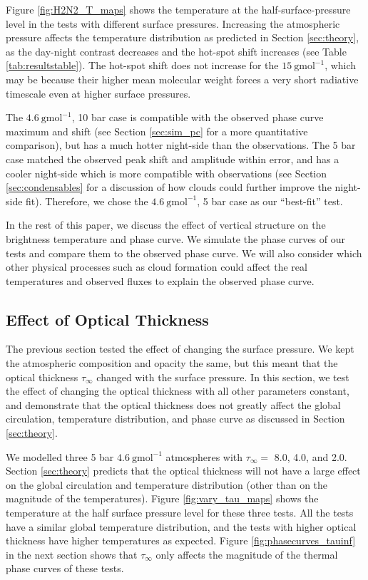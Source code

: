 Figure \ref{fig:H2N2_T_maps} shows the temperature at the half-surface-pressure level in the tests with different surface pressures. Increasing the atmospheric pressure affects the temperature distribution as predicted in Section \ref{sec:theory}, as the day-night contrast decreases and the hot-spot shift increases (see Table \ref{tab:resultstable}). The hot-spot shift does not increase for the $15\ \mathrm{gmol}^{-1}$, which may be because their higher mean molecular weight forces a very short radiative timescale even at higher surface pressures.

The $4.6\ \mathrm{gmol}^{-1}$, 10 bar case is compatible with the observed phase curve maximum and shift (see Section \ref{sec:sim_pc} for a more quantitative comparison), but has a much hotter night-side than the observations. The 5 bar case matched the observed peak shift and amplitude within error, and has a cooler night-side which is more compatible with observations (see Section \ref{sec:condensables} for a discussion of how clouds could further improve the night-side fit). Therefore, we chose the $4.6\ \mathrm{gmol}^{-1}$, 5 bar case as our ``best-fit'' test.

In the rest of this paper, we discuss the effect of vertical structure on the brightness temperature and phase curve. We simulate the phase curves of our tests and compare them to the observed phase curve. We will also consider which other physical processes such as cloud formation could affect the real temperatures and observed fluxes to explain the observed phase curve.


\subsection{Effect of Optical Thickness}\label{sec:tauinf_effect}


The previous section tested the effect of changing the surface pressure. We kept the atmospheric composition and opacity the same, but this meant that the optical thickness $\tau_{\infty}$ changed with the surface pressure. In this section, we test the effect of changing the optical thickness with all other parameters constant, and demonstrate that the optical thickness does not greatly affect the global circulation, temperature distribution, and phase curve as discussed in Section \ref{sec:theory}.

We modelled three 5 bar $4.6\ \mathrm{gmol}^{-1}$ atmospheres with $\tau_{\infty} =$ 8.0, 4.0, and 2.0. Section \ref{sec:theory} predicts that the optical thickness will not have a large effect on the global circulation and temperature distribution (other than on the magnitude of the temperatures). Figure \ref{fig:vary_tau_maps} shows the temperature at the half surface pressure level for these three tests. All the tests have a similar global temperature distribution, and the tests with higher optical thickness have higher temperatures as expected. Figure \ref{fig:phasecurves_tauinf} in the next section shows that $\tau_{\infty}$ only affects the magnitude of the thermal phase curves of these tests.

